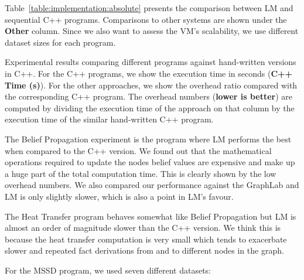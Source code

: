 Table~\ref{table:implementation:absolute} presents the comparison between LM and
sequential C++ programs. Comparisons to other systems are shown under the
\textbf{Other} column. Since we also want to assess the VM's scalability, we use
different dataset sizes for each program.

\begin{table}[ht]
   \begin{center}
      
   \end{center}

   \caption{Experimental results comparing different programs against
      hand-written versions in C++. For the C++ programs, we show the execution
      time in seconds (\textbf{C++ Time (s)}). For the other approaches, we show
      the overhead ratio compared with the corresponding C++ program. The
      overhead numbers (\textbf{lower is better}) are computed by dividing the
   execution time of the approach on that column by the execution time of the
similar hand-written C++ program.}

   \label{table:implementation:absolute}
\end{table}

The Belief Propagation experiment is the program where LM performs the best when
compared to the C++ version. We found out that the mathematical operations
required to update the nodes belief values are expensive and make up a huge part
of the total computation time. This is clearly shown by the low overhead
numbers. We also compared our performance against the GraphLab and LM is only
slightly slower, which is also a point in LM's favour.

The Heat Transfer program behaves somewhat like Belief Propagation but LM is
almost an order of magnitude slower than the C++ version. We think this is
because the heat transfer computation is very small which tends to exacerbate
slower and repeated fact derivations from and to different nodes in the graph.

For the MSSD program, we used seven different datasets:


